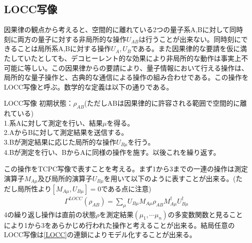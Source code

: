 \documentclass[a4paper,10.5pt]{article}
\numberwithin{equation}{section}
\begin{document}
\subsection{LOCC写像}
因果律の観点から考えると、空間的に離れている2つの量子系A,Bに対して同時刻に両方の量子に対する非局所的な操作$U_{AB}$は行うことが出来ない。同時刻にできることは局所系A,Bに対する操作$U_{A},U_{B}$である。また因果律的な要請を仮に満たしていたとしても、デコヒーレント的な効果により非局所的な動作は事実上不可能に等しい。この因果律からの要請により、量子情報において行える操作は、局所的な量子操作と、古典的な通信による操作の組み合わせである。この操作をLOCC写像と呼ぶ。数学的な定義は以下の通りである。
\begin{defbox}{LOCC写像}
初期状態：$\rho_{AB}$(ただしABは因果律的に許容される範囲で空間的に離れている)\\
1.系Aに対して測定を行い、結果$\mu$を得る。\\
2.AからBに対して測定結果を送信する。\\
3.Bが測定結果に応じた局所的な操作$U_{B\mu}$を行う。\\
4.Bが測定を行い、BからAに同様の操作を施す。以後これを繰り返す。\\
\end{defbox}
この操作をTCPC写像で表すことを考える。まず1から3までの一連の操作は測定演算子$M_{A\mu}$及び局所的演算子$U_{B\mu}$を用いて以下のように表すことが出来る。(ただし局所性より$[M_{A\mu},U_{B\mu}]=0$である点に注意)
\begin{equation}\begin{split}
    \Gamma^{LOCC}(\rho_{AB})=\sum_{\mu} U_{B\mu}M_{A\mu}\rho_{AB}M_{A\mu}^{\dagger} \label{LOCC}U_{B\mu}^{\dagger}
\end{split} \end{equation}
4の繰り返し操作は直前の状態$\rho$を測定結果$(\mu_{1},\cdots \mu_{n})$の多変数関数と見ることにより1から3をあらかじめ行われた操作と考えることが出来る。結局任意のLOCC写像は\eqref{LOCC}の連鎖によりモデル化することが出来る。
\end{document}
